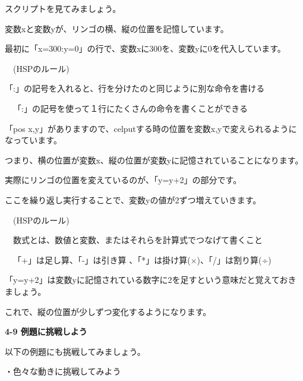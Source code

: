 \documentclass[a4paper,dvipdfmx]{jarticle}
\begin{document}
\bigskip


\bigskip


\bigskip


\bigskip


\bigskip


\bigskip

スクリプトを見てみましょう。


\bigskip

変数xと変数yが、リンゴの横、縦の位置を記憶しています。

最初に「x=300:y=0」の行で、変数xに300を、変数yに0を代入しています。


\bigskip

\ \ (HSPのルール)


\bigskip

「:」の記号を入れると、行を分けたのと同じように別な命令を書ける

\ \ 「:」の記号を使って１行にたくさんの命令を書くことができる


\bigskip

「pos
x,y」がありますので、celputする時の位置を変数x,yで変えられるようになっています。

つまり、横の位置が変数x、縦の位置が変数yに記憶されていることになります。


\bigskip

実際にリンゴの位置を変えているのが、「y=y+2」の部分です。

ここを繰り返し実行することで、変数yの値が2ずつ増えていきます。


\bigskip

\ \ (HSPのルール)


\bigskip

\ \ 数式とは、数値と変数、またはそれらを計算式でつなげて書くこと

\ \ 「+」は足し算、「-」は引き算
、「*」は掛け算(×)、「/」は割り算(÷) 


\bigskip

「y=y+2」は変数yに記憶されている数字に2を足すという意味だと覚えておきましょう。

これで、縦の位置が少しずつ変化するようになります。


\bigskip


\bigskip

{\bfseries
4-9 例題に挑戦しよう}


\bigskip

以下の例題にも挑戦してみましょう。


\bigskip

・色々な動きに挑戦してみよう
\end{document}
